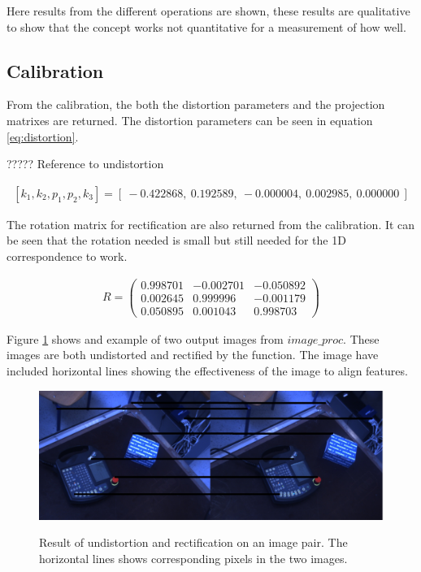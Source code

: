 Here results from the different operations are shown, these results are qualitative to show that the concept works not quantitative for a measurement of how well.

\subsection{Calibration}

From the calibration, the both the distortion parameters and the projection matrixes are returned. The distortion parameters can be seen in equation \ref{eq:distortion}. 


????? Reference to undistortion 


\begin{equation}\label{eq:distortion}
\begin{split}
[ k_{1}, k_{2}, p_{1}, p_{2}, k_{3} ] = [\ -0.422868,\ 0.192589,\ -0.000004,\ 0.002985,\ 0.000000\ ]
\end{split}
\end{equation} 

The rotation matrix for rectification are also returned from the calibration. It can be seen that the rotation needed is small but still needed for the 1D correspondence to work. 

\begin{equation}\label{eq:distortion}
\begin{split}
R =
 \begin{pmatrix}
  0.998701 & -0.002701 & -0.050892 \\
  0.002645 & 0.999996 & -0.001179 \\
  0.050895 & 0.001043 & 0.998703 
 \end{pmatrix}
\end{split}
\end{equation}

Figure \ref{fig:rectified} shows and example of two output images from $image\_proc$. These images are both undistorted and rectified by the function. The image have included horizontal lines showing the effectiveness of the image to align features.

\begin{figure}[h!]
  \caption{Result of undistortion and rectification on an image pair. The horizontal lines shows corresponding pixels in the two images.}
  \centering
    \includegraphics[width=\textwidth]{graphics/06_vision/rectified.jpg}
    \label{fig:rectified}
\end{figure}

